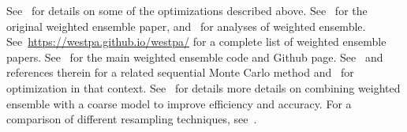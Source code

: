 \documentclass[11pt,letterpaper]{amsart}
\theoremstyle{plain}
\theoremstyle{definition}
\numberwithin{equation}{section}
\begin{document}
See~\cite{aristoff2016analysis,aristoff2018steady} for details on some of the 
optimizations described above. See~\cite{huber1996weighted} for the original 
weighted ensemble paper, and~\cite{aristoff2016analysis,aristoff2019ergodic,aristoff2018steady,
bhatt2010steady,costaouec2013analysis,darve2013computing,
zhang2010weighted,zuckerman} 
for analyses of weighted ensemble. See~\url{https://westpa.github.io/westpa/}
for a complete list of weighted ensemble papers. See~\cite{westpa,zwier2015westpa} for the main weighted ensemble 
code and Github page.
See~\cite{del2004feynman,del2005genealogical,webber1} 
and references therein for a 
related sequential Monte Carlo method and~\cite{chraibi2018optimal,webber1} for 
optimization in that context. See~\cite{jeremy} 
for details more details on 
combining weighted ensemble with a coarse 
model to improve efficiency and accuracy. For 
a comparison of different resampling techniques, 
see~\cite{douc2005comparison,webber2}.
\end{document}
